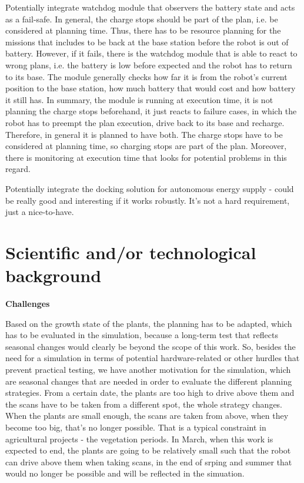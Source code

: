 \documentclass[german, master, expose, latin1]{base/thesis_KBS}
\begin{document}
Potentially integrate watchdog module that observers the battery state and acts as a fail-safe. In general, the charge stops should be part of the plan,
i.e. be considered at planning time. Thus, there has to be resource planning for the missions that includes to be back at the base station before the robot is out of battery.
However, if it fails, there is the watchdog module that is able to react to wrong plans, i.e. the battery is low before expected and the robot has to return to its base.
The module generally checks how far it is from the robot's current position to the base station, how much battery that would cost and how battery it still has.
In summary, the module is running at execution time, it is not planning the charge stops beforehand, it just reacts to failure cases, in which the robot has to preempt
the plan execution, drive back to its base and recharge. Therefore, in general it is planned to have both. The charge stops have to be considered at planning time,
so charging stops are part of the plan. Moreover, there is monitoring at execution time that looks for potential problems in this regard.\newline

Potentially integrate the docking solution for autonomous energy supply - could be really good and interesting if it works robustly.
It's not a hard requirement, just a nice-to-have.\newline

\section{Scientific and/or technological background}

\textbf{Challenges}\newline

Based on the growth state of the plants, the planning has to be adapted, which has to be evaluated in the simulation, because a long-term test that reflects
seasonal changes would clearly be beyond the scope of this work. So, besides the need for a simulation in terms of potential hardware-related or other hurdles
that prevent practical testing, we have another motivation for the simulation, which are seasonal changes that are needed in order to evaluate the different
planning strategies. From a certain date, the plants are too high to drive above them and the scans have to be taken from a different spot, the whole strategy changes.
When the plants are small enough, the scans are taken from above, when they become too big, that's no longer possible.
That is a typical constraint in agricultural projects - the vegetation periods.
In March, when this work is expected to end, the plants are going to be relatively small such that the robot can drive above them when taking
scans, in the end of srping and summer that would no longer be possible and will be reflected in the simuation.
\end{document}
